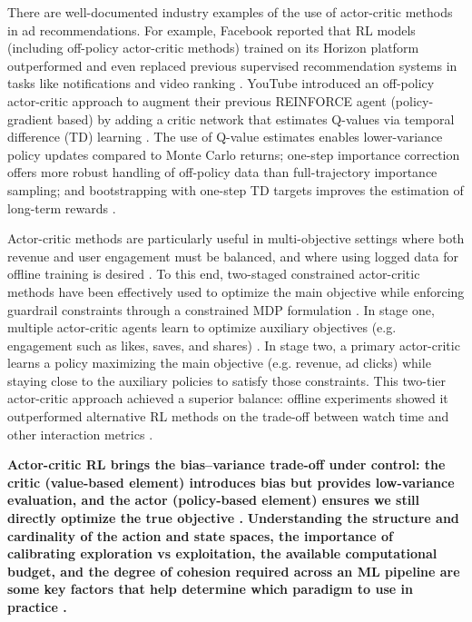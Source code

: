 \documentclass[final]{anthology-ch}         %
\begin{document}
There are well-documented industry examples of the use of actor-critic methods in ad recommendations. For example, Facebook reported that RL models (including off-policy actor-critic methods) trained on its Horizon platform outperformed and even replaced previous supervised recommendation systems in tasks like notifications and video ranking \cite{gauci2018horizon}. YouTube introduced an off-policy actor-critic approach to augment their previous REINFORCE agent (policy-gradient based) by adding a critic network that estimates Q-values via temporal difference (TD) learning \cite{chen2022off}. The use of Q-value estimates enables lower-variance policy updates compared to Monte Carlo returns; one-step importance correction offers more robust handling of off-policy data than full-trajectory importance sampling; and bootstrapping with one-step TD targets improves the estimation of long-term rewards \cite{chen2022off}.

 Actor-critic methods are particularly useful in multi-objective settings where both revenue and user engagement must be balanced, and where using logged data for offline training is desired \cite{cai2023two}. To this end, two-staged constrained actor-critic methods have been effectively used to optimize the main objective while enforcing guardrail constraints through a constrained MDP formulation \cite{cai2023two}. In stage one, multiple actor-critic agents learn to optimize auxiliary objectives (e.g. engagement such as likes, saves, and shares) \cite{cai2023two}. In stage two, a primary actor-critic learns a policy maximizing the main objective (e.g. revenue, ad clicks) while staying close to the auxiliary policies to satisfy those constraints. This two-tier actor-critic approach achieved a superior balance: offline experiments showed it outperformed alternative RL methods on the trade-off between watch time and other interaction metrics \cite{cai2023two}.

\textbf{Actor-critic RL brings the bias–variance trade-off under control: the critic (value-based element) introduces bias but provides low-variance evaluation, and the actor (policy-based element) ensures we still directly optimize the true objective \cite{chen2022off, Sutton1998}.}\textbf{ Understanding the structure and cardinality of the action and state spaces, the importance of calibrating exploration vs exploitation, the available computational budget, and the degree of cohesion required across an ML pipeline are some key factors that help determine which paradigm to use in practice \cite{dulac2019challenges, schulman2017proximal, zhu2021overview}.}
\end{document}
